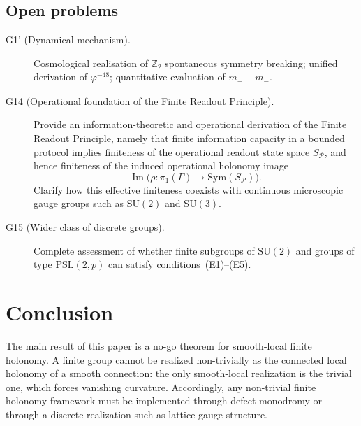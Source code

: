 \documentclass[sn-mathphys-num,Numbered]{sn-jnl}
\theoremstyle{thmstyleone}
\theoremstyle{thmstylethree}
\theoremstyle{thmstyletwo}
\begin{document}
\subsection{Open problems}
\label{ssec:open-problems}

\begin{description}
  \item[G1' (Dynamical mechanism).]
    Cosmological realisation of $\mathbb{Z}_2$ spontaneous symmetry
    breaking; unified derivation of $\varphi^{-48}$; quantitative
    evaluation of $m_+ - m_-$.

  \item[G14 (Operational foundation of the Finite Readout Principle).]
    Provide an information-theoretic and operational derivation of the
    Finite Readout Principle, namely that finite information capacity in
    a bounded protocol implies finiteness of the operational readout
    state space $S_{\mathcal P}$, and hence finiteness of the induced
    operational holonomy image
    \[
    \operatorname{Im}\!\bigl(\rho:\pi_1(\Gamma)\to \mathrm{Sym}(S_{\mathcal P})\bigr).
    \]
    Clarify how this effective finiteness coexists with continuous
    microscopic gauge groups such as $\mathrm{SU}(2)$ and
    $\mathrm{SU}(3)$.

  \item[G15 (Wider class of discrete groups).]
    Complete assessment of whether finite subgroups of $\mathrm{SU}(2)$
    and groups of type $\mathrm{PSL}(2,p)$ can satisfy
    conditions~(E1)--(E5).
\end{description}

\section{Conclusion}
\label{sec:conclusion}

The main result of this paper is a no-go theorem for smooth-local finite
holonomy. A finite group cannot be realized non-trivially as the
connected local holonomy of a smooth connection: the only smooth-local
realization is the trivial one, which forces vanishing curvature.
Accordingly, any non-trivial finite holonomy framework must be
implemented through defect monodromy or through a discrete realization
such as lattice gauge structure.
\end{document}

